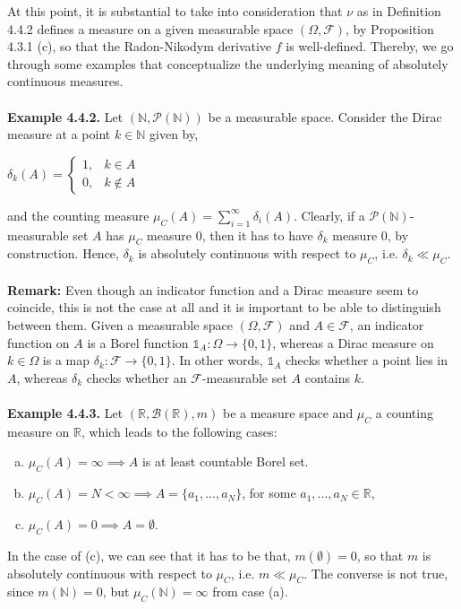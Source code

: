\documentclass{article}
\begin{document}
At this point, it is substantial to take into consideration that $\nu$ as in Definition 4.4.2 defines a measure on a given measurable space $(\Omega,\mathcal{F})$, by Proposition 4.3.1 (c), so that the Radon-Nikodym derivative $f$ is well-defined. Thereby, we go through some examples that conceptualize the underlying meaning of absolutely continuous measures.\\\\
\textbf{Example 4.4.2.} Let $(\mathbb{N},\mathcal{P}(\mathbb{N}))$ be a measurable space. Consider the Dirac measure at a point $k \in \mathbb{N}$ given by,
\begin{center}
	$\delta_k(A) =
	\begin{cases}
	1, & k \in A\\
	0, & k \notin A
	\end{cases}$
\end{center}
and the counting measure $\mu_C(A) = \sum_{i=1}^{\infty}\delta_i(A)$. Clearly, if a $\mathcal{P}(\mathbb{N})$-measurable set $A$ has $\mu_C$ measure $0$, then it has to have $\delta_k$ measure $0$, by construction. Hence, $\delta_k$ is absolutely continuous with respect to $\mu_C$, i.e. $\delta_k \ll \mu_C$. \\\\
\textbf{Remark:} Even though an indicator function and a Dirac measure seem to coincide, this is not the case at all and it is important to be able to distinguish between them. Given a measurable space $(\Omega,\mathcal{F})$ and $A \in \mathcal{F}$, an indicator function on $A$ is a Borel function $\mathds{1}_A:\Omega\to\{0,1\}$, whereas a Dirac measure on $k \in \Omega$ is a map $\delta_k:\mathcal{F}\to\{0,1\}$. In other words, $\mathds{1}_A$ checks whether a point lies in $A$, whereas $\delta_k$ checks whether an $\mathcal{F}$-measurable set $A$ contains $k$.\\\\
\textbf{Example 4.4.3.} Let $(\mathbb{R},\mathcal{B}(\mathbb{R}),m)$ be a measure space and $\mu_C$ a counting measure on $\mathbb{R}$, which leads to the following cases:
\begin{enumerate}[(a)]
	\item $\mu_C(A) = \infty \implies A$ is at least countable Borel set.
	\item $\mu_C(A) = N < \infty \implies A = \{a_1,...,a_N\}$, for some $a_1,...,a_N \in \mathbb{R}$,
	\item $\mu_C(A) = 0 \implies A = \emptyset$.
\end{enumerate}
In the case of (c), we can see that it has to be that, $m(\emptyset)=0$, so that $m$ is absolutely continuous with respect to $\mu_C$, i.e. $m \ll \mu_C$. The converse is not true, since $m(\mathbb{N}) = 0$, but $\mu_C(\mathbb{N}) = \infty$ from case (a).\\\\
\end{document}
